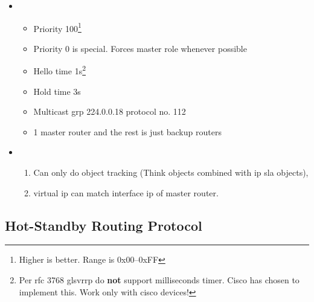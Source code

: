 \begin{itemize}
    \item {}
    \begin{itemize}
        \item Priority 100\footnote{Higher is better. Range is 0x00--0xFF}
        \item Priority 0 is special. Forces master role whenever possible
        \item Hello time 1s\footnote{Per \gls{rfc} 3768 gls{vrrp} do \textbf{not} support milliseconds timer. Cisco has chosen to implement this. Work only with cisco devices!}
        \item Hold time 3s
        \item Multicast grp 224.0.0.18 protocol no. 112
        \item 1 master router and the rest is just backup routers
    \end{itemize}
    \item {}
    \begin{enumerate}
        \item Can only do object tracking {\footnotesize (Think objects combined with ip sla objects),}
        \item virtual ip can match interface ip of master router.
    \end{enumerate}
\end{itemize}

\newpage

\subsection[HSRP]{Hot-Standby Routing Protocol}

